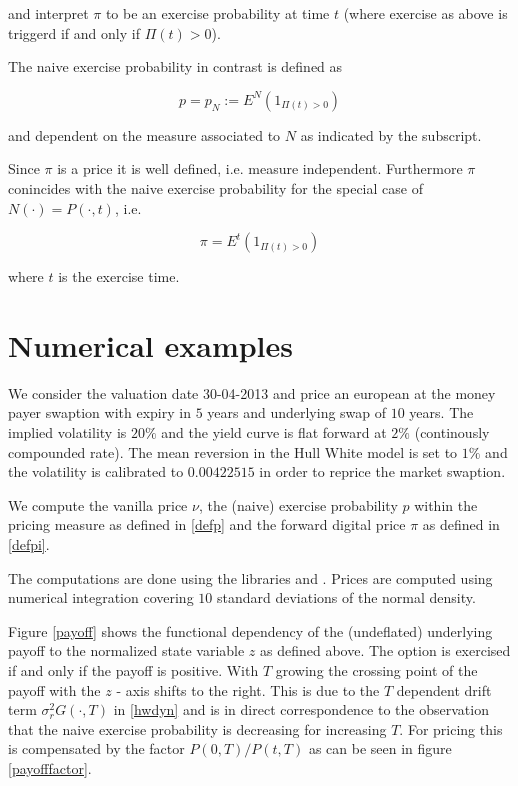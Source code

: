 \documentclass{amsart}
\theoremstyle{plain}
\numberwithin{equation}{section}
\begin{document}
and interpret $\pi$ to be an exercise probability at time $t$ (where exercise as above is triggerd if and only if $\Pi(t)>0$). 

The naive exercise probability in contrast is defined as

\begin{equation}\label{defp}
p = p_N := E^N(1_{\Pi(t)>0})
\end{equation}

and dependent on the measure associated to $N$ as indicated by the subscript.

Since $\pi$ is a price it is well defined, i.e. measure independent. Furthermore $\pi$ conincides with the naive exercise probability for the special case of $N(\cdot)=P(\cdot,t)$, i.e.

\begin{equation}
\pi = E^t ( 1_{\Pi(t)>0} )
\end{equation}

where $t$ is the exercise time.

\section{Numerical examples}

We consider the valuation date 30-04-2013 and price an european at the money payer swaption with expiry in $5$ years and underlying swap of $10$ years.
The implied volatility is $20\%$ and the yield curve is flat forward at $2\%$ (continously compounded rate). The mean reversion in the Hull White
model is set to $1\%$ and the volatility is calibrated to $0.00422515$ in order to reprice the market swaption.

We compute the vanilla price $\nu$, the (naive) exercise probability $p$ within the pricing measure as defined in \ref{defp} and the forward digital price $\pi$ as defined in \ref{defpi}.

The computations are done using the libraries \cite{ql} and \cite{ntl}. Prices are computed using numerical integration covering $10$ standard deviations of the normal density.

Figure \ref{payoff} shows the functional dependency of the (undeflated) underlying payoff to the normalized state variable $z$ as defined above. The option is exercised if and only if the payoff is positive. With $T$ growing the crossing point of the payoff with the $z$ - axis shifts to the right. This is due to the $T$ dependent drift term $\sigma_r^2 G(\cdot,T)$ in \ref{hwdyn} and is in direct correspondence to the observation that the naive exercise probability is decreasing for increasing $T$. For pricing this is compensated by the factor $P(0,T)/P(t,T)$ as can be seen in figure \ref{payofffactor}.
\end{document}
